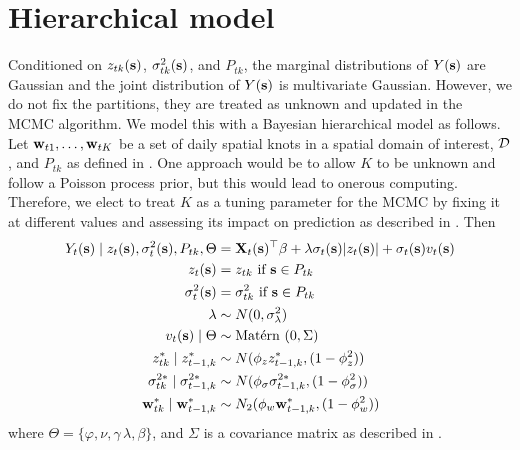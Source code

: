 \documentclass[useAMS,usenatbib,referee]{biom}
\begin{document}
\section{Hierarchical model}\label{sts:hier}
Conditioned on $z_{tk}(\mbox{\bf s})$, $\sigma^2_{tk}(\mbox{\bf s})$, and $P_{tk}$, the marginal distributions of $Y(\mbox{\bf s})$ are Gaussian and the joint distribution of $Y(\mbox{\bf s})$ is multivariate Gaussian.
However, we do not fix the partitions, they are treated as unknown and updated in the MCMC algorithm.
We model this with a Bayesian hierarchical model as follows.
Let $\mbox{\bf w}_{t1}, \ldots, \mbox{\bf w}_{tK}$ be a set of daily spatial knots in a spatial domain of interest, $\calD$, and $P_{tk}$ as defined in .
One approach would be to allow $K$ to be unknown and follow a Poisson process prior, but this would lead to onerous computing.
Therefore, we elect to treat $K$ as a tuning parameter for the MCMC by fixing it at different values and assessing its impact on prediction as described in .
Then
\begin{align}
   Y_t(\bs) \mid z_{t}(\bs), \sigma_t^2(\bs), P_{tk}, \Theta &= \bX_t(\bs)^\top \beta + \lambda \sigma_t(\bs) |z_t(\bs)| + \sigma_t(\bs) v_t(\bs) \label{steq:hier}\\
   z_t(\bs) &= z_{tk} \text{ if } \bs \in P_{tk}\nonumber\\
   \sigma^2_{t}(\bs) &= \sigma^2_{tk} \text{ if } \bs \in P_{tk}\nonumber\\
   \lambda & \sim N(0, \sigma^2_\lambda)\nonumber\\
   v_t(\bs) \mid \Theta &\sim \Matern(0, \Sigma)\nonumber\\
   z^*_{tk} \mid z^*_{t-1, k} &\sim N(\phi_z z^*_{t-1, k}, (1 - \phi_z^2))\nonumber\\
   \sigma^{2*}_{tk} \mid \sigma^{2*}_{t-1, k} &\sim N(\phi_\sigma \sigma^{2*}_{t-1, k}, (1 - \phi_\sigma^2))\nonumber\\
   \bw^*_{tk} \mid \bw^*_{t-1, k} &\sim N_2(\phi_w \bw^*_{t-1, k}, (1 - \phi_w^2)) \nonumber
\end{align}
where $\Theta = \{\varphi, \nu, \gamma\, \lambda, \beta\}$, and $\Sigma$ is a \Matern covariance matrix as described in .
\end{document}
